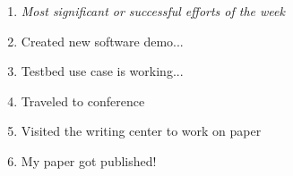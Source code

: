 \begin{enumerate}
    \item \textit{Most significant or successful efforts of the week}
    \item Created new software demo...
    \item Testbed use case is working...
    \item Traveled to conference
    \item Visited the writing center to work on paper
    \item My paper got published!

\end{enumerate}